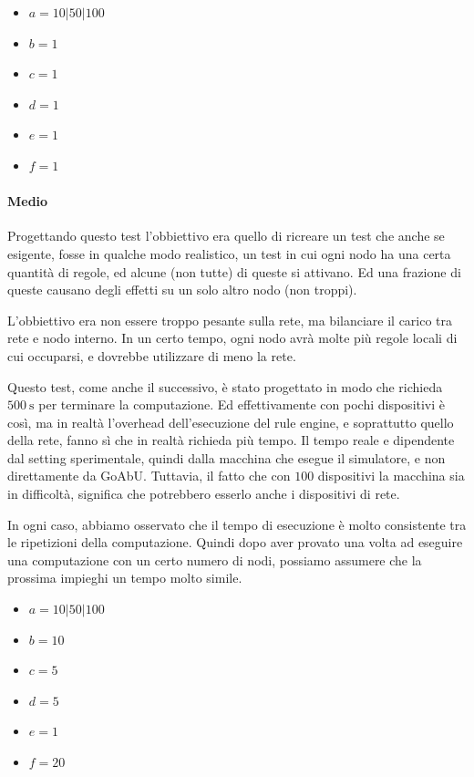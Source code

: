 \documentclass[12pt, a4paper]{article}
\begin{document}
    \begin{itemize}
        \item $a=10|50|100$
        \item $b=1$
        \item $c=1$
        \item $d=1$
        \item $e=1$
        \item $f=1$
    \end{itemize}

    \paragraph{Medio}

    Progettando questo test l'obbiettivo era quello di ricreare un test che anche se esigente, fosse in qualche modo realistico, un test in cui ogni nodo ha una certa quantità di regole, ed alcune (non tutte) di queste si attivano. Ed una frazione di queste causano degli effetti su un solo altro nodo (non troppi).

    L'obbiettivo era non essere troppo pesante sulla rete, ma bilanciare il carico tra rete e nodo interno. In un certo tempo, ogni nodo avrà molte più regole locali di cui occuparsi, e dovrebbe utilizzare di meno la rete.

    Questo test, come anche il successivo, è stato progettato in modo che richieda $\qty{500}{\second}$ per terminare la computazione. Ed effettivamente con pochi dispositivi è così, ma in realtà l'overhead dell'esecuzione del rule engine, e soprattutto quello della rete, fanno sì che in realtà richieda più tempo.
    Il tempo reale e dipendente dal setting sperimentale, quindi dalla macchina che esegue il simulatore, e non direttamente da GoAbU. Tuttavia, il fatto che con $100$ dispositivi la macchina sia in difficoltà, significa che potrebbero esserlo anche i dispositivi di rete.

    In ogni caso, abbiamo osservato che il tempo di esecuzione è molto consistente tra le ripetizioni della computazione. Quindi dopo aver provato una volta ad eseguire una computazione con un certo numero di nodi, possiamo assumere che la prossima impieghi un tempo molto simile.

    \begin{itemize}
        \item $a=10|50|100$
        \item $b=10$
        \item $c=5$
        \item $d=5$
        \item $e=1$
        \item $f=20$
    \end{itemize}
\end{document}
